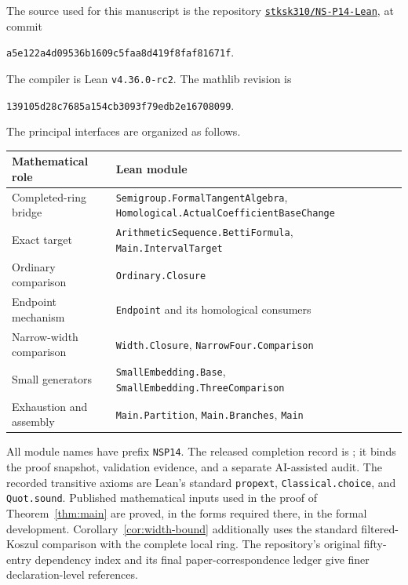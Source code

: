 The source used for this manuscript is the repository
\href{https://github.com/stksk310/NS-P14-Lean}{\texttt{stksk310/NS-P14-Lean}},
at commit
\begin{center}\small
\texttt{a5e122a4d09536b1609c5faa8d419f8faf81671f}.
\end{center}
The compiler is Lean \texttt{v4.36.0-rc2}. The mathlib revision is
\begin{center}\small
\texttt{139105d28c7685a154cb3093f79edb2e16708099}.
\end{center}
The principal interfaces are organized as follows.
\begin{center}\small
\begin{tabular}{p{.28\linewidth}p{.62\linewidth}}
\toprule
Mathematical role&Lean module\\\midrule
Completed-ring bridge&\raggedright\arraybackslash
\texttt{Semigroup.FormalTangentAlgebra},
\texttt{Homological.ActualCoefficientBaseChange}\\
Exact target&\texttt{ArithmeticSequence.BettiFormula},
\texttt{Main.IntervalTarget}\\
Ordinary comparison&\texttt{Ordinary.Closure}\\
Endpoint mechanism&\texttt{Endpoint} and its homological consumers\\
Narrow-width comparison&\texttt{Width.Closure}, \texttt{NarrowFour.Comparison}\\
Small generators&\texttt{SmallEmbedding.Base},
\texttt{SmallEmbedding.ThreeComparison}\\
Exhaustion and assembly&\texttt{Main.Partition}, \texttt{Main.Branches},
\texttt{Main}\\\bottomrule
\end{tabular}
\end{center}
All module names have prefix \texttt{NSP14}.
The released completion record is
; it binds
the proof snapshot, validation evidence, and a separate AI-assisted audit.
The recorded transitive axioms are Lean's standard
\texttt{propext}, \texttt{Classical.choice}, and \texttt{Quot.sound}.
Published mathematical inputs used in the proof of
Theorem~\ref{thm:main} are proved, in the forms required there, in the
formal development. Corollary~\ref{cor:width-bound} additionally uses
the standard filtered-Koszul comparison with the complete local ring.
The repository's original fifty-entry dependency index and its final
paper-correspondence ledger give finer declaration-level references.

